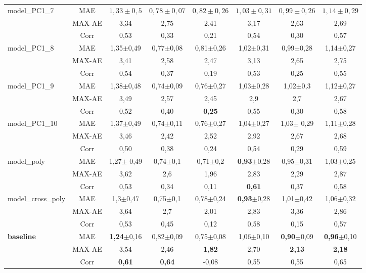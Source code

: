 \begin{table}[h!]
\begin{center}
\begin{tabular}{lc||c|c|c|c|c|c}
			\hline
			model\_PC1\_7&MAE &$1,33\pm{0,5}$&$0,78\pm{0,07}$&$0,82\pm{0,26}$&$1,03\pm{0,31}$&$0,99\pm{0,26}$&$1,14\pm{0,29}$\\
			&MAX-AE &3,34&2,75&2,41&3,17&2,63&2,69\\
			&Corr &0,53&0,33&0,21&0,54&0,30&0,57\\
			
			\hline
			model\_PC1\_8&MAE & 1,35$\pm$0,49 & 0,77$\pm$0,08& 0,81$\pm$0,26&1,02$\pm$0,31& 0,99$\pm$0,28 & 1,14$\pm$0,27\\
			&MAX-AE &3,41&2,58&2,47&3,13&2,65&2,75\\
			&Corr &0,54&0,37&0,19&0,53&0,25&0,55\\
			
			\hline
			model\_PC1\_9&MAE & 1,38$\pm$0,48 & 0,74$\pm$0,09 & 0,76$\pm$0,27 & 1,03$\pm$0,28 & 1,02$\pm$0,3 & 1,12$\pm$0,27\\
			&MAX-AE &3,49&2,57&2,45&2,9&2,7&2,67\\
			&Corr &0,52&0,40&\textbf{0,25}&0,55&0,30&0,58\\
			
			\hline
			model\_PC1\_10&MAE & 1,37$\pm$0,49 & 0,74$\pm$0,11 & 0,76$\pm$0,27 & 1,04$\pm$0,27 & 1,03$\pm$ 0,29& 1,11$\pm$0,28\\
			&MAX-AE &3,46&2,42&2,52&2,92&2,67&2,68\\
			&Corr &0,50&0,38&0,24&0,54&0,29&0,59\\
			
			\hline
			model\_poly&MAE & 1,27$\pm$ 0,49 & 0,74$\pm$0,1 & 0,71$\pm$0,2 & \textbf{0,93}$\pm$0,28 & 0,95$\pm$0,31 & 1,03$\pm$0,25\\
			&MAX-AE &3,62&2,6&1,96&2,83&2,29&2,87\\
			&Corr &0,53&0,34&0,11&\textbf{0,61}&0,37&0,58\\
			
			\hline
			model\_cross\_poly&MAE & 1,3$\pm$0,47 & 0,75$\pm$0,1 & 0,78$\pm$0,24 & \textbf{0,93}$\pm$0,28 & 1,01$\pm$0,42 & 1,06$\pm$0,32 \\
			&MAX-AE &3,64&2,7&2,01&2,83&3,36&2,86\\
			&Corr &0,53&0,45&0,12&0,58&0,15&0,57\\
			\hline 
			
			\textbf{baseline}& MAE & \textbf{1,24}$\pm$0,16 & 0,82$\pm$0,09 & 0,75$\pm$0,08 & 1,06$\pm$0,10 & \textbf{0,90}$\pm$0,09 & \textbf{0,96}$\pm$0,10 \\
			&MAX-AE & 3,54 & 2,46 & \textbf{1,82} & 2,70 & \textbf{2,13} & \textbf{2,18}\\
			&Corr   & \textbf{0,61} & \textbf{0,64} &-0,08 & 0,55 & 0,55 & 0,65\\
			\hline
		\end{tabular}
	\end{center}
	\label{tab:H_testset}
\end{table}
